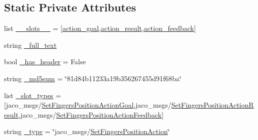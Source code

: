 \subsection*{Static Private Attributes}
\begin{DoxyCompactItemize}
\item 
list \hyperlink{classjaco__msgs_1_1msg_1_1__SetFingersPositionAction_1_1SetFingersPositionAction_acda3ad98095087bd96153d03f19edd6a}{\+\_\+\+\_\+slots\+\_\+\+\_\+} = \mbox{[}\textquotesingle{}\hyperlink{classjaco__msgs_1_1msg_1_1__SetFingersPositionAction_1_1SetFingersPositionAction_a0cf79d9f8f0d91ffd627f18a56a1ad37}{action\+\_\+goal}\textquotesingle{},\textquotesingle{}\hyperlink{classjaco__msgs_1_1msg_1_1__SetFingersPositionAction_1_1SetFingersPositionAction_a9c7765c3d8629a4ddcf9f708a7f27618}{action\+\_\+result}\textquotesingle{},\textquotesingle{}\hyperlink{classjaco__msgs_1_1msg_1_1__SetFingersPositionAction_1_1SetFingersPositionAction_a76f21c4051d28de27edd5aa7cca269ba}{action\+\_\+feedback}\textquotesingle{}\mbox{]}
\item 
string \hyperlink{classjaco__msgs_1_1msg_1_1__SetFingersPositionAction_1_1SetFingersPositionAction_a068ac62c10d00f88f6590e0c84eea8b9}{\+\_\+full\+\_\+text}
\item 
bool \hyperlink{classjaco__msgs_1_1msg_1_1__SetFingersPositionAction_1_1SetFingersPositionAction_a113d715a1e6e325db8a1338e62c7445f}{\+\_\+has\+\_\+header} = False
\item 
string \hyperlink{classjaco__msgs_1_1msg_1_1__SetFingersPositionAction_1_1SetFingersPositionAction_a0c472dafbfd8121501817aa1006a9bd9}{\+\_\+md5sum} = \char`\"{}81d84b11233a19b356267455d91f68ba\char`\"{}
\item 
list \hyperlink{classjaco__msgs_1_1msg_1_1__SetFingersPositionAction_1_1SetFingersPositionAction_a0cf71e7b8919a831d7866c749ff2f76a}{\+\_\+slot\+\_\+types} = \mbox{[}\textquotesingle{}jaco\+\_\+msgs/\hyperlink{classjaco__msgs_1_1msg_1_1__SetFingersPositionActionGoal_1_1SetFingersPositionActionGoal}{Set\+Fingers\+Position\+Action\+Goal}\textquotesingle{},\textquotesingle{}jaco\+\_\+msgs/\hyperlink{classjaco__msgs_1_1msg_1_1__SetFingersPositionActionResult_1_1SetFingersPositionActionResult}{Set\+Fingers\+Position\+Action\+Result}\textquotesingle{},\textquotesingle{}jaco\+\_\+msgs/\hyperlink{classjaco__msgs_1_1msg_1_1__SetFingersPositionActionFeedback_1_1SetFingersPositionActionFeedback}{Set\+Fingers\+Position\+Action\+Feedback}\textquotesingle{}\mbox{]}
\item 
string \hyperlink{classjaco__msgs_1_1msg_1_1__SetFingersPositionAction_1_1SetFingersPositionAction_a483249771e15dcc93ac8a13c525da205}{\+\_\+type} = \char`\"{}jaco\+\_\+msgs/\hyperlink{classjaco__msgs_1_1msg_1_1__SetFingersPositionAction_1_1SetFingersPositionAction}{Set\+Fingers\+Position\+Action}\char`\"{}
\end{DoxyCompactItemize}


